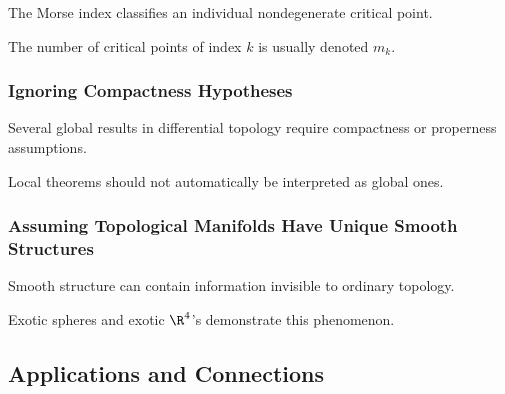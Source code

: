 The Morse index classifies an individual nondegenerate critical point.

The number of critical points of index \(k\) is usually denoted \(m_k\).

\subsubsection{Ignoring Compactness Hypotheses}

Several global results in differential topology require compactness or
properness assumptions.

Local theorems should not automatically be interpreted as global ones.

\subsubsection{Assuming Topological Manifolds Have Unique Smooth Structures}

Smooth structure can contain information invisible to ordinary topology.

Exotic spheres and exotic \(\R^4\)'s demonstrate this phenomenon.

\subsection{Applications and Connections}
\label{subsec:differential-topology-applications}

